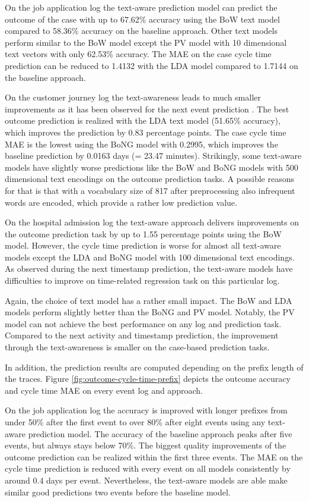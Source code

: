 On the job application log the text-aware prediction model can predict the outcome of the case with up to 67.62\% accuracy using the BoW text model compared to 58.36\% accuracy on the baseline approach.
Other text models perform similar to the BoW model except the PV model with 10 dimensional text vectors with only 62.53\% accuracy.
The MAE on the case cycle time prediction can be reduced to 1.4132 with the LDA model compared to 1.7144 on the baseline approach.

On the customer journey log the text-awareness leads to much smaller improvements as it has been observed for the next event prediction .
The best outcome prediction is realized with the LDA text model (51.65\% accuracy), which improves the prediction by 0.83 percentage points.
The case cycle time MAE is the lowest using the BoNG model with 0.2995, which improves the baseline prediction by 0.0163 days (= 23.47 minutes).
Strikingly, some text-aware models have slightly worse predictions like the BoW and BoNG models with 500 dimensional text encodings on the outcome prediction tasks.
A possible reasons for that is that with a vocabulary size of 817 after preprocessing also infrequent words are encoded, which provide a rather low prediction value.

On the hospital admission log the text-aware approach delivers improvements on the outcome prediction task by up to 1.55 percentage points using the BoW model.
However, the cycle time prediction is worse for almost all text-aware models except the LDA and BoNG model with 100 dimensional text encodings.
As observed during the next timestamp prediction, the text-aware models have difficulties to improve on time-related regression task on this particular log.

Again, the choice of text model has a rather small impact.
The BoW and LDA models perform slightly better than the BoNG and PV model.
Notably, the PV model can not achieve the best performance on any log and prediction task.
Compared to the next activity and timestamp prediction, the improvement through the text-awareness is smaller on the case-based prediction tasks.

In addition, the prediction results are computed depending on the prefix length of the traces.
Figure \ref{fig:outcome-cycle-time-prefix} depicts the outcome accuracy and cycle time MAE on every event log and approach.

On the job application log the accuracy is improved with longer prefixes from under 50\% after the first event to over 80\% after eight events using any text-aware prediction model.
The accuracy of the baseline approach peaks after five events, but always stays below 70\%.
The biggest quality improvements of the outcome prediction can be realized within the first three events.
The MAE on the cycle time prediction is reduced with every event on all models consistently by around 0.4 days per event.
Nevertheless, the text-aware models are able make similar good predictions two events before the baseline model.


